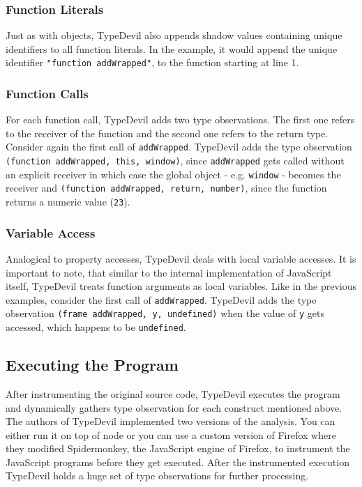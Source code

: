 \documentclass[runningheads,a4paper]{llncs}
\begin{document}
\subsubsection{Function Literals}
Just as with objects, TypeDevil also appends shadow values containing unique identifiers to all function literals.
In the example, it would append the unique identifier \lstinline[columns=fixed]{"function addWrapped"}, to the function starting at line 1.

\subsubsection{Function Calls}
For each function call, TypeDevil adds two type observations.
The first one refers to the receiver of the function and the second one refers to the return type.
Consider again the first call of \lstinline[columns=fixed]{addWrapped}.
TypeDevil adds the type observation \lstinline[columns=fixed]{(function addWrapped, this, window)}, since \lstinline[columns=fixed]{addWrapped} gets called without an explicit receiver in which case the global object - e.g. \lstinline[columns=fixed]{window} - becomes the receiver
and \lstinline[columns=fixed]{(function addWrapped, return, number)}, since the function returns a numeric value (\lstinline[columns=fixed]{23}).

\subsubsection{Variable Access}
Analogical to property accesses, TypeDevil deals with local variable accesses.
It is important to note, that similar to the internal implementation of JavaScript itself, TypeDevil treats function arguments as local variables.
Like in the previous examples, consider the first call of \lstinline[columns=fixed]{addWrapped}.
TypeDevil adds the type observation \lstinline[columns=fixed]{(frame addWrapped, y, undefined)} when the value of \lstinline[columns=fixed]{y} gets accessed, which happens to be \lstinline[columns=fixed]{undefined}.

\subsection{Executing the Program}
After instrumenting the original source code, TypeDevil executes the program and dynamically gathers type observation for each construct mentioned above.
The authors of TypeDevil implemented two versions of the analysis. 
You can either run it on top of node or you can use a custom version of Firefox where they modified Spidermonkey, the JavaScript engine of Firefox, to instrument the JavaScript programs before they get executed.
After the instrumented execution TypeDevil holds a huge set of type observations for further processing.
\end{document}
